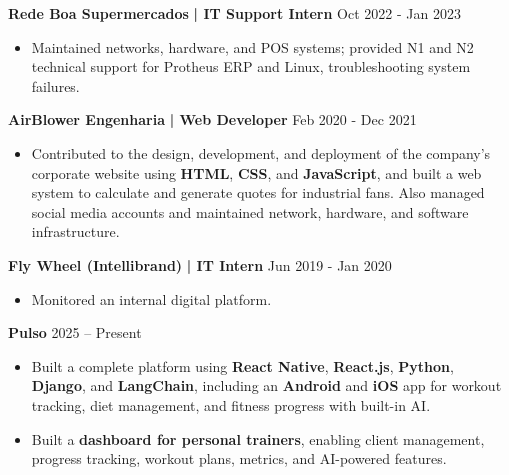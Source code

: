     \textbf{Rede Boa Supermercados}\textbf{ | IT Support Intern } \hfill  Oct 2022 - Jan 2023\\
    \vspace{-3mm}
    \begin{itemize} \itemsep -3pt
        \item Maintained networks, hardware, and POS systems; provided N1 and N2 technical support for Protheus ERP and Linux, troubleshooting system failures.
    \end{itemize}

    \textbf{AirBlower Engenharia}\textbf{ | Web Developer } \hfill  Feb 2020 - Dec 2021\\
    \vspace{-3mm}
    \begin{itemize} \itemsep -3pt
        \item Contributed to the design, development, and deployment of the company's corporate website using \textbf{HTML}, \textbf{CSS}, and \textbf{JavaScript}, and built a web system to calculate and generate quotes for industrial fans. Also managed social media accounts and maintained network, hardware, and software infrastructure.
    \end{itemize}

    \textbf{Fly Wheel (Intellibrand)}\textbf{ | IT Intern } \hfill  Jun 2019 - Jan 2020\\
    \vspace{-3mm}
    \begin{itemize} \itemsep -3pt
        \item Monitored an internal digital platform.
    \end{itemize}

    \vspace{2mm}
    
    \textbf{Pulso} \hfill  2025 -- Present\\
    \vspace{-3mm}
    \begin{itemize} \itemsep -3pt
        \item Built a complete platform using \textbf{React Native}, \textbf{React.js}, \textbf{Python}, \textbf{Django}, and \textbf{LangChain}, including an \textbf{Android} and \textbf{iOS} app for workout tracking, diet management, and fitness progress with built-in AI.
        \item Built a \textbf{dashboard for personal trainers}, enabling client management, progress tracking, workout plans, metrics, and AI-powered features.
    \end{itemize}
    
